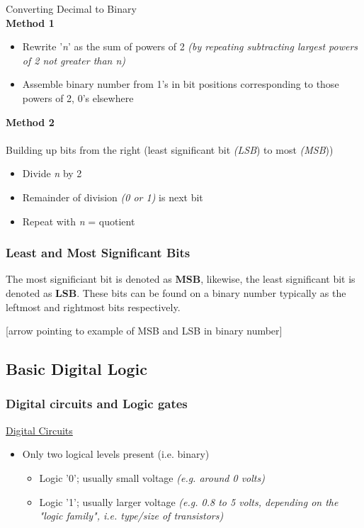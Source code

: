 \documentclass{article}
\begin{document}
Converting Decimal to Binary \\

\textbf{Method 1}
\begin{itemize}
\item Rewrite '\textit{n}' as the sum of powers of 2 \textit{(by repeating subtracting largest powers of 2 not greater
than n)}
\item Assemble binary number from 1's in bit positions corresponding to those powers of 2, 0's elsewhere
\end{itemize}

\textbf{Method 2} \\ \\
Building up bits from the right (least significant bit \textit{(LSB}) to most \textit{(MSB}))
\begin{itemize}
\item Divide \textit{n} by 2
\item Remainder of division \textit{(0 or 1)} is next bit
\item Repeat with \textit{n} = quotient
\end{itemize}

\subsubsection{Least and Most Significant Bits}
The most significiant bit is denoted as \textbf{MSB}, likewise, the least significant bit is denoted as \textbf{LSB}.
These bits can be found on a binary number typically as the leftmost and rightmost bits respectively.

[arrow pointing to example of MSB and LSB in binary number]

\subsection{Basic Digital Logic}
\subsubsection{Digital circuits and Logic gates}

\underline{Digital Circuits}
\begin{itemize}
\item Only two logical levels present (i.e. binary)
\begin{itemize}
\item Logic '0'; usually small voltage \textit{(e.g. around 0 volts)}
\item Logic '1'; usually larger voltage \textit{(e.g. 0.8 to 5 volts, depending on the "logic family", i.e. type/size of
transistors)}
\end{itemize}
\end{itemize}
\end{document}
